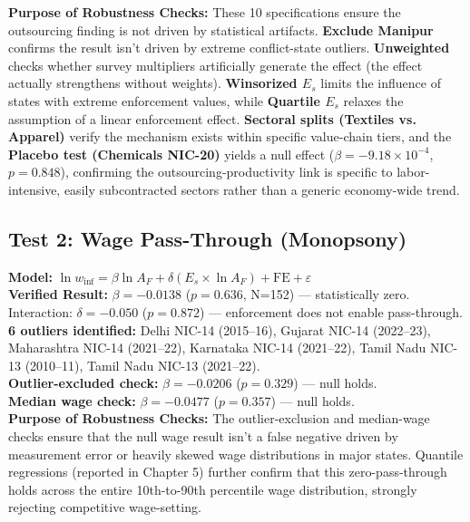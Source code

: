 \documentclass[11pt]{article}
\begin{document}
	\textbf{Purpose of Robustness Checks:} These 10 specifications ensure the outsourcing finding is not driven by statistical artifacts. \textbf{Exclude Manipur} confirms the result isn't driven by extreme conflict-state outliers. \textbf{Unweighted} checks whether survey multipliers artificially generate the effect (the effect actually strengthens without weights). \textbf{Winsorized $E_s$} limits the influence of states with extreme enforcement values, while \textbf{Quartile $E_s$} relaxes the assumption of a linear enforcement effect. \textbf{Sectoral splits (Textiles vs. Apparel)} verify the mechanism exists within specific value-chain tiers, and the \textbf{Placebo test (Chemicals NIC-20)} yields a null effect ($\beta = -9.18 \times 10^{-4}$, $p=0.848$), confirming the outsourcing-productivity link is specific to labor-intensive, easily subcontracted sectors rather than a generic economy-wide trend.
	
	\subsection{Test 2: Wage Pass-Through (Monopsony)}
	\textbf{Model:} $\ln w_{\text{inf}} = \beta \ln A_{F} + \delta (E_s \times \ln A_{F}) + \text{FE} + \varepsilon$ \\
	\textbf{Verified Result:} $\beta = -0.0138$ ($p=0.636$, N=152) — statistically zero. \\
	Interaction: $\delta = -0.050$ ($p=0.872$) — enforcement does not enable pass-through. \\[4pt]
	\textbf{6 outliers identified:} Delhi NIC-14 (2015--16), Gujarat NIC-14 (2022--23), Maharashtra NIC-14 (2021--22), Karnataka NIC-14 (2021--22), Tamil Nadu NIC-13 (2010--11), Tamil Nadu NIC-13 (2021--22). \\
	\textbf{Outlier-excluded check:} $\beta = -0.0206$ ($p=0.329$) — null holds. \\
	\textbf{Median wage check:} $\beta = -0.0477$ ($p=0.357$) — null holds. \\[4pt]
	\textbf{Purpose of Robustness Checks:} The outlier-exclusion and median-wage checks ensure that the null wage result isn't a false negative driven by measurement error or heavily skewed wage distributions in major states. Quantile regressions (reported in Chapter 5) further confirm that this zero-pass-through holds across the entire 10th-to-90th percentile wage distribution, strongly rejecting competitive wage-setting.
	
\end{document}
